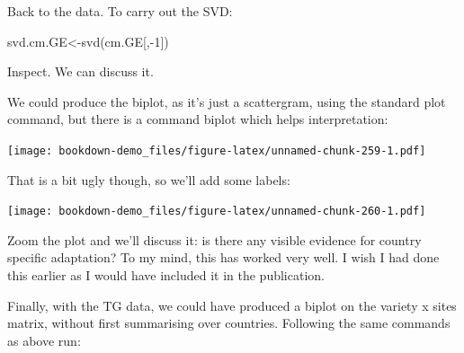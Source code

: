 \documentclass[
]{book}
\newenvironment{Shaded}{\begin{snugshade}}{\end{snugshade}}
\newcommand{\AttributeTok}[1]{\textcolor[rgb]{0.77,0.63,0.00}{#1}}
\newcommand{\DecValTok}[1]{\textcolor[rgb]{0.00,0.00,0.81}{#1}}
\newcommand{\FloatTok}[1]{\textcolor[rgb]{0.00,0.00,0.81}{#1}}
\newcommand{\FunctionTok}[1]{\textcolor[rgb]{0.00,0.00,0.00}{#1}}
\newcommand{\NormalTok}[1]{#1}
\newcommand{\OtherTok}[1]{\textcolor[rgb]{0.56,0.35,0.01}{#1}}
\newcommand{\SpecialCharTok}[1]{\textcolor[rgb]{0.00,0.00,0.00}{#1}}
\newcommand{\StringTok}[1]{\textcolor[rgb]{0.31,0.60,0.02}{#1}}
\begin{document}
Back to the data. To carry out the SVD:

\begin{Shaded}
\begin{Highlighting}[]
\NormalTok{svd.cm.GE}\OtherTok{\textless{}{-}}\FunctionTok{svd}\NormalTok{(cm.GE[,}\SpecialCharTok{{-}}\DecValTok{1}\NormalTok{])}
\end{Highlighting}
\end{Shaded}

Inspect. We can discuss it.

We could produce the biplot, as it's just a scattergram, using the standard plot command, but there is a command biplot which helps interpretation:

\begin{Shaded}
\end{Shaded}

\texttt{[image: bookdown-demo\_files/figure-latex/unnamed-chunk-259-1.pdf]}

That is a bit ugly though, so we'll add some labels:

\begin{Shaded}
\end{Shaded}

\texttt{[image: bookdown-demo\_files/figure-latex/unnamed-chunk-260-1.pdf]}

Zoom the plot and we'll discuss it: is there any visible evidence for country specific adaptation? To my mind, this has worked very well. I wish I had done this earlier as I would have included it in the publication.

Finally, with the TG data, we could have produced a biplot on the variety x sites matrix, without first summarising over countries. Following the same commands as above run:
\end{document}
